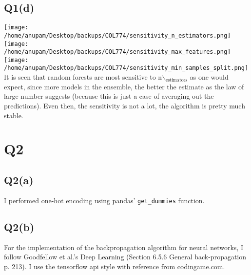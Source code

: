 \documentclass[11pt]{article}
\begin{document}
\subsection{Q1(d)}
\label{sec-1-4}
\texttt{[image: /home/anupam/Desktop/backups/COL774/sensitivity\_n\_estimators.png]}
\texttt{[image: /home/anupam/Desktop/backups/COL774/sensitivity\_max\_features.png]}
\texttt{[image: /home/anupam/Desktop/backups/COL774/sensitivity\_min\_samples\_split.png]}
It is seen that random forests are most sensitive to n$\backslash$$_{\text{estimators}}$ as
one would expect, since more models in the ensemble, the better the
estimate as the law of large number suggests (because this is just a
case of averaging out the predictions). Even then, the sensitivity is
not a lot, the algorithm is pretty much stable.

\section{Q2}
\label{sec-2}
\subsection{Q2(a)}
\label{sec-2-1}
I performed one-hot encoding using pandas' \texttt{get_dummies} function.
\subsection{Q2(b)}
\label{sec-2-2}
For the implementation of the backpropagation algorithm for neural
networks, I follow Goodfellow et al.'s Deep Learning\cite{goodfellow}
(Section 6.5.6 General back-propagation p. 213). I use the tensorflow
api style with reference from codingame.com\cite{codingame}.
\end{document}
